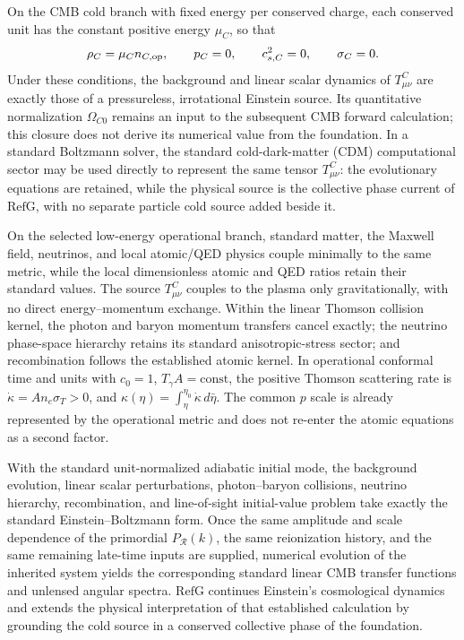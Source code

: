 \documentclass[11pt,a4paper]{article}
\newcommand{\RefG}{\mathrm{RefG}}
\begin{document}
On the CMB cold branch with fixed energy per conserved charge, each conserved unit has the constant positive energy $\mu_C$, so that
\begin{equation}
\rho_C=\mu_C n_{C,{\rm op}},\qquad
p_C=0,\qquad c_{s,C}^2=0,\qquad \sigma_C=0.
\end{equation}
Under these conditions, the background and linear scalar dynamics of $T^C_{\mu\nu}$ are exactly those of a pressureless, irrotational Einstein source. Its quantitative normalization $\Omega_{C0}$ remains an input to the subsequent CMB forward calculation; this closure does not derive its numerical value from the foundation. In a standard Boltzmann solver, the standard cold-dark-matter (CDM) computational sector may be used directly to represent the same tensor $T^C_{\mu\nu}$: the evolutionary equations are retained, while the physical source is the collective phase current of $\RefG$, with no separate particle cold source added beside it.

On the selected low-energy operational branch, standard matter, the Maxwell field, neutrinos, and local atomic/QED physics couple minimally to the same metric, while the local dimensionless atomic and QED ratios retain their standard values. The source $T^C_{\mu\nu}$ couples to the plasma only gravitationally, with no direct energy--momentum exchange. Within the linear Thomson collision kernel, the photon and baryon momentum transfers cancel exactly; the neutrino phase-space hierarchy retains its standard anisotropic-stress sector; and recombination follows the established atomic kernel. In operational conformal time and units with $c_0=1$, $T_\gamma A=\mathrm{const}$, the positive Thomson scattering rate is $\dot\kappa=A n_e\sigma_T>0$, and $\kappa(\eta)=\int_\eta^{\eta_0}\dot\kappa\,d\bar\eta$. The common $p$ scale is already represented by the operational metric and does not re-enter the atomic equations as a second factor.

With the standard unit-normalized adiabatic initial mode, the background evolution, linear scalar perturbations, photon--baryon collisions, neutrino hierarchy, recombination, and line-of-sight initial-value problem take exactly the standard Einstein--Boltzmann form. Once the same amplitude and scale dependence of the primordial $P_{\mathcal R}(k)$, the same reionization history, and the same remaining late-time inputs are supplied, numerical evolution of the inherited system yields the corresponding standard linear CMB transfer functions and unlensed angular spectra. $\RefG$ continues Einstein's cosmological dynamics and extends the physical interpretation of that established calculation by grounding the cold source in a conserved collective phase of the foundation.
\end{document}
